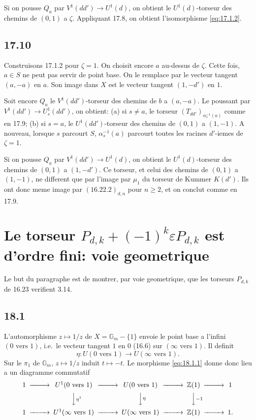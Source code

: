 \documentclass[12pt,a4paper]{article}
\theoremstyle{plain}
\theoremstyle{definition}
\theoremstyle{remark}
\newcommand{\Gm}{\mathbb{G}_m}
\newcommand{\ZZ}{\mathbb{Z}}
\begin{document}
Si on pousse $Q_a$ par $V^1(dd') \to U^1(d)$, on obtient le
$U^1(d)$-torseur des chemins de $(0,1)$ a $\zeta$. Appliquant 17.8, on
obtient l'isomorphisme \eqref{eq:17.1.2}.

\subsection{17.10}

Construisons 17.1.2 pour $\zeta = 1$. On choisit encore $a$
au-dessus de $\zeta$. Cette fois, $a \in S$ ne peut pas servir de point
base. On le remplace par le vecteur tangent $(a,-a)$ en $a$. Son
image dans $X$ est le vecteur tangent $(1,-d')$ en $1$.

Soit encore $Q_a$ le $V^1(dd')$-torseur des chemins de $b$ a
$(a,-a)$. Le poussant par $V^1(dd') \to U_s^1(dd')$, on obtient: (a)
si $s \neq a$, le torseur $(T_{dd'})_{\alpha_s^{-1}(a)}$ comme en 17.9;
(b) si $s = a$, le $U^1(dd')$-torseur des chemins de $(0,1)$ a
$(1,-1)$. A nouveau, lorsque $s$ parcourt $S$, $\alpha_s^{-1}(a)$
parcourt toutes les racines $d'$-iemes de $\zeta = 1$.

Si on pousse $Q_a$ par $V^1(dd') \to U^1(d)$, on obtient le
$U^1(d)$-torseur des chemins de $(0,1)$ a $(1,-d')$. Ce torseur, et
celui des chemins de $(0,1)$ a $(1,-1)$, ne different que par
l'image par $\mu_1$ du torseur de Kummer $K(d')$. Ils ont donc meme
image par $(16.22.2)_{d,n}$ pour $n \geq 2$, et on conclut comme en
17.9.


\section{Le torseur $P_{d,k} + (-1)^k \varepsilon P_{d,k}$ est d'ordre fini:
voie geometrique}\label{sec:18}

Le but du paragraphe est de montrer, par voie geometrique, que les
torseurs $P_{d,k}$ de 16.23 verifient 3.14.

\subsection{18.1}

L'automorphisme $z \mapsto 1/z$ de $X = \Gm - \{1\}$ envoie le point
base a l'infini $(0 \text{ vers } 1)$, i.e.\ le vecteur tangent $1$ en
$0$ (16.6) sur $(\infty \text{ vers } 1)$. Il definit
\begin{equation}\label{eq:18.1.1}
\eta : U(0 \text{ vers } 1) \to U(\infty \text{ vers } 1).
\end{equation}
Sur le $\pi_1$ de $\Gm$, $z \mapsto 1/z$ induit $t \mapsto -t$. Le
morphisme \eqref{eq:18.1.1} donne donc lieu a un diagramme commutatif
\begin{equation}\label{eq:18.1.2}
\begin{CD}
1 @>>> U^1(0 \text{ vers } 1) @>>> U(0 \text{ vers } 1) @>>> \ZZ(1) @>>> 1 \\
@. @VV{\eta^1}V @VV{\eta}V @VV{-1}V \\
1 @>>> U^1(\infty \text{ vers } 1) @>>> U(\infty \text{ vers } 1) @>>> \ZZ(1) @>>> 1.
\end{CD}
\end{equation}
\end{document}

